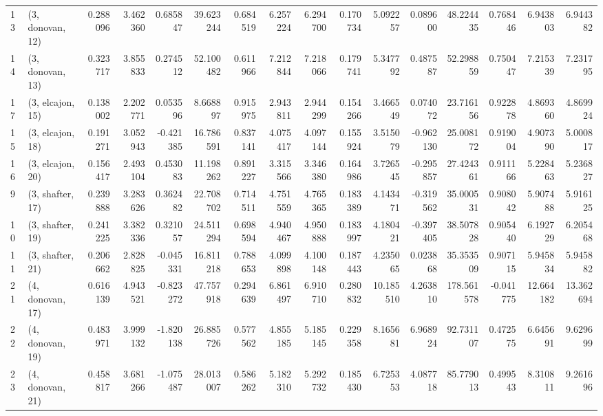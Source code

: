 \begin{tabular}{llrrrrrrrrrrrrrr}
13 &  (3, donovan, 12) &   0.288096 &  3.462360 &  0.685847 &  39.623244 &  0.684519 &   6.257224 &  6.294700 &  0.170734 &   5.092257 &  0.089600 &   48.224435 &  0.768446 &   6.943803 &   6.944382 \\
14 &  (3, donovan, 13) &   0.323717 &  3.855833 &  0.274512 &  52.100482 &  0.611966 &   7.212844 &  7.218066 &  0.179741 &   5.347792 &  0.487587 &   52.298859 &  0.750447 &   7.215339 &   7.231795 \\
17 &  (3, elcajon, 15) &   0.138002 &  2.202771 &  0.053596 &   8.668897 &  0.915975 &   2.943811 &  2.944299 &  0.154266 &   3.466549 &  0.074072 &   23.716156 &  0.922878 &   4.869360 &   4.869924 \\
15 &  (3, elcajon, 18) &   0.191271 &  3.052943 & -0.421385 &  16.786591 &  0.837141 &   4.075417 &  4.097144 &  0.155924 &   3.515079 & -0.962130 &   25.008172 &  0.919004 &   4.907390 &   5.000817 \\
16 &  (3, elcajon, 20) &   0.156417 &  2.493104 &  0.453083 &  11.198262 &  0.891227 &   3.315566 &  3.346380 &  0.164986 &   3.726545 & -0.295857 &   27.424361 &  0.911166 &   5.228463 &   5.236827 \\
9  &  (3, shafter, 17) &   0.239888 &  3.283626 &  0.362482 &  22.708702 &  0.714511 &   4.751559 &  4.765365 &  0.183389 &   4.143471 & -0.319562 &   35.000531 &  0.908042 &   5.907488 &   5.916125 \\
10 &  (3, shafter, 19) &   0.241225 &  3.382336 &  0.321057 &  24.511294 &  0.698594 &   4.940467 &  4.950888 &  0.183997 &   4.180421 & -0.397405 &   38.507828 &  0.905440 &   6.192729 &   6.205468 \\
11 &  (3, shafter, 21) &   0.206662 &  2.828825 & -0.045331 &  16.811218 &  0.788653 &   4.099898 &  4.100148 &  0.187443 &   4.235065 &  0.023868 &   35.353509 &  0.907115 &   5.945834 &   5.945882 \\
21 &  (4, donovan, 17) &   0.616139 &  4.943521 & -0.823272 &  47.757918 &  0.294639 &   6.861497 &  6.910710 &  0.280832 &  10.185510 &  4.263810 &  178.561578 & -0.041775 &  12.664182 &  13.362694 \\
22 &  (4, donovan, 19) &   0.483971 &  3.999132 & -1.820138 &  26.885726 &  0.577562 &   4.855185 &  5.185145 &  0.229358 &   8.165681 &  6.968924 &   92.731107 &  0.472575 &   6.645691 &   9.629699 \\
23 &  (4, donovan, 21) &   0.458817 &  3.681266 & -1.075487 &  28.013007 &  0.586262 &   5.182310 &  5.292732 &  0.185430 &   6.725353 &  4.087718 &   85.779013 &  0.499543 &   8.310811 &   9.261696 \\

\end{tabular}
